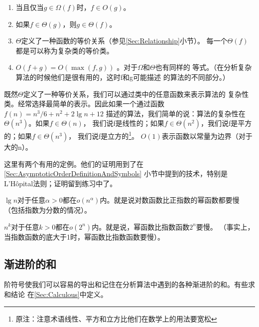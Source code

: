 \begin{lemma}\mbox{}\par
\begin{enumerate}
\item 当且仅当$g \in \Omega(f)$时，$f\in O(g)$。
\item 如果$f\in \Theta(g)$，则$g\in \Theta(f)$。
\item $\Theta$定义了一种函数的等价关系（参见\ref{Sec:Relationship}小节）。
        每一个$\Theta(f)$都是可以称为复杂类的等价类。
\item $O(f+g)=O(\max(f,g))$  。对于$\Omega$和$\Theta$也有同样的
        等式。（在分析复杂算法的时候他们是很有用的，这时f和g可能描述
        的算法的不同部分。）
\end{enumerate}
\end{lemma}

既然$\Theta$定义了一种等价关系，我们可以通过类中的任意函数来表示算法的
复杂性类。经常选择最简单的表示。因此如果一个通过函数$f(n)=n^3/6+n^2+2\lg n +12$
描述的算法，我们简单的说：算法的复杂性在$\Theta(n^3)$。如果$f\in \Theta(n)$，
我们说f是线性的；如果$f\in \Theta(n^2)$，我们说f是平方的；如果$f\in \Theta(n^3)$，
我们说f是立方的\footnote{原注：注意术语线性、平方和立方比他们在数学上的用法要宽松}。
$O(1)$表示函数以常量为边界（对于大的n）。

这里有两个有用的定例。他们的证明用到了在\ref{Sec:AsymptoticOrderDefinitionAndSymbols}
小节中提到的技术，特别是L'H\^{o}pital法则；证明留到练习中了。

\begin{lemma}
$\lg n$对于任意$\alpha>0$都在$o(n^\alpha)$内。就是说对数函数比正指数的幂函数都要慢
（包括指数为分数的情况）。
\end{lemma}

\begin{lemma}
$n^k$对于任意$k>0$都在$o(2^n)$内。就是说，幂函数比指数函数$2^n$要慢。
（事实上，当指数函数的底大于1时，幂函数比指数函数要慢）。
\end{lemma}

\subsection{渐进阶的和}
阶符号使我们可以容易的导出和记住在分析算法中遇到的各种渐进阶的和。有些求和结论
在\ref{Sec:Calculous}中定义。

